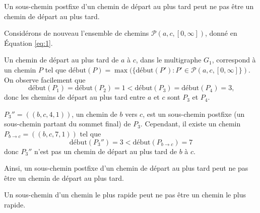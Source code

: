 \begin{assertion}
  Un sous-chemin postfixe d'un chemin de départ au plus tard peut ne pas être un
  chemin de départ au plus tard.
\end{assertion}

\begin{reponse}
  Considérons de nouveau l'ensemble de chemins $\mathcal{P}(a,c,[0, \infty])$,
  donné en Équation \ref{eq:1}.

  Un chemin de départ au plus tard de $a$ à $c$, dans le multigraphe $G_1$,
  correspond à un chemin $P$ tel que
  $\mathrm{début}(P) = \max(\{\mathrm{début}(P'): P' \in
  \mathcal{P}(a,c,[0, \infty]\})$. On observe facilement que
  \begin{equation}
    \mathrm{début}(P_1) = \mathrm{début}(P_2) = 1 < \mathrm{début}(P_3) =
    \mathrm{début}(P_4) = 3 \text{,}
  \end{equation}
  donc les chemins de départ au plus tard entre $a$ et $c$ sont $P_3$ et $P_4$.

  $P_{3}'' = ((b,c,4,1))$, un chemin de $b$ vers $c$, est un sous-chemin
  postfixe (un sous-chemin partant du sommet final) de $P_3$. Cependant, il
  existe un chemin $P_{b \rightarrow c} = ((b,c,7,1))$ tel que
  \begin{equation}
    \mathrm{début}(P_{3}'') = 3 < \mathrm{début}(P_{b \rightarrow c}) = 7
    \label{eq:5}
  \end{equation}
  donc $P_{3}''$ n'est pas un chemin de départ au plus tard de $b$ à $c$.

  Ainsi, un sous-chemin postfixe d'un chemin de départ au plus tard peut ne pas
  être un chemin de départ au plus tard.
\end{reponse}

\begin{assertion}
  Un sous-chemin d'un chemin le plus rapide peut ne pas être un chemin le plus
  rapide.\label{assert:rapide}
\end{assertion}


